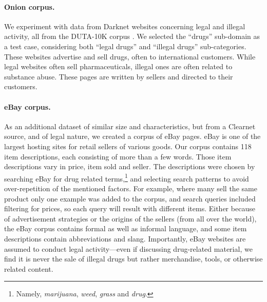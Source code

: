 \documentclass[11pt,a4paper,table]{article}
\begin{document}
\paragraph{Onion corpus.}
We experiment with data from Darknet websites concerning
legal and illegal activity, all from the DUTA-10K corpus \citep{AlNabki19}.
We selected the ``drugs'' sub-domain as a test case, considering both ``legal drugs'' and ``illegal drugs'' sub-categories.
These websites advertise and sell
drugs, often to international customers.
While legal websites often sell pharmaceuticals,
illegal ones are often related to substance abuse.
These pages are written by sellers and directed to their customers.
  

\paragraph{eBay corpus.}
As an additional dataset of similar size and characteristics,
but from a Clearnet source, and of legal nature,
we created a corpus of eBay pages.
eBay is one of the largest hosting sites for retail sellers of various goods. Our corpus contains 118 item descriptions, each consisting of more than a few words. Those item descriptions vary in price, item sold and seller. The descriptions were chosen by searching eBay for drug related terms,\footnote{Namely,  \textit{marijuana}, \textit{weed}, \textit{grass} and \textit{drug}.} and selecting search patterns to avoid over-repetition of the mentioned factors. For example, where many sell the same product only one example was added to the corpus, and search queries included filtering for prices, so each query will result with different items. Either because of advertisement strategies or the origins of the sellers (from all over the world), the eBay corpus contains formal as well as informal language, and some item descriptions contain abbreviations and slang.
Importantly, eBay websites are assumed to conduct legal activity---even
if discussing drug-related material, we find it is never the sale of illegal
drugs but rather merchandise, tools, or otherwise related content.
\end{document}
